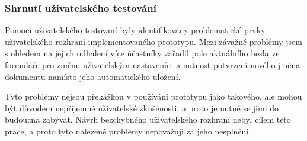 \subsubsection{Shrnutí uživatelského testování}

Pomocí uživatelského testovaní byly identifikovány problematické prvky uživatelského rozhraní implementovaného prototypu.
Mezi závažné problémy jsem s ohledem na jejich odhalení více účastníky zařadil pole aktuálního hesla ve formuláře pro změnu uživatelským nastavením a nutnost potvrzení nového jména dokumentu namísto jeho automatického uložení.

Tyto problémy nejsou překážkou v používání prototypu jako takového, ale mohou být důvodem nepříjemné uživatelské zkušenosti, a proto je nutné se jimi do budoucna zabývat.
Návrh bezchybného uživatelského rozhraní nebyl cílem této práce, a proto tyto nalezené problémy nepovažuji za jeho nesplnění.
